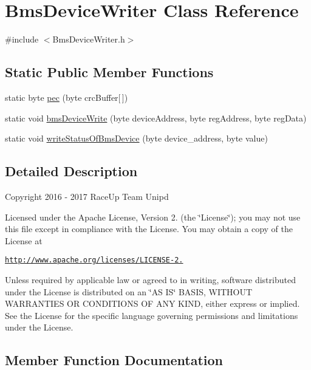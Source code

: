 \hypertarget{class_bms_device_writer}{}\section{Bms\+Device\+Writer Class Reference}
\label{class_bms_device_writer}


{\ttfamily \#include $<$Bms\+Device\+Writer.\+h$>$}

\subsection*{Static Public Member Functions}
\begin{DoxyCompactItemize}
\item 
static byte \hyperlink{class_bms_device_writer_a874622816d57ff0424f99818e974b4a6}{pec} (byte crc\+Buffer\mbox{[}$\,$\mbox{]})
\item 
static void \hyperlink{class_bms_device_writer_af4b5e88a6ca9bf82af0693fe8fc1086a}{bms\+Device\+Write} (byte device\+Address, byte reg\+Address, byte reg\+Data)
\item 
static void \hyperlink{class_bms_device_writer_a43507694298062698dd72e1ff7599bea}{write\+Status\+Of\+Bms\+Device} (byte device\+\_\+address, byte value)
\end{DoxyCompactItemize}


\subsection{Detailed Description}
Copyright 2016 -\/ 2017 Race\+Up Team Unipd

Licensed under the Apache License, Version 2. (the \char`\"{}\+License\char`\"{}); you may not use this file except in compliance with the License. You may obtain a copy of the License at

\href{http://www.apache.org/licenses/LICENSE-2.0}{\tt http\+://www.\+apache.\+org/licenses/\+L\+I\+C\+E\+N\+S\+E-\/2.}

Unless required by applicable law or agreed to in writing, software distributed under the License is distributed on an \char`\"{}\+A\+S I\+S\char`\"{} B\+A\+S\+IS, W\+I\+T\+H\+O\+UT W\+A\+R\+R\+A\+N\+T\+I\+ES OR C\+O\+N\+D\+I\+T\+I\+O\+NS OF A\+NY K\+I\+ND, either express or implied. See the License for the specific language governing permissions and limitations under the License. 

\subsection{Member Function Documentation}
